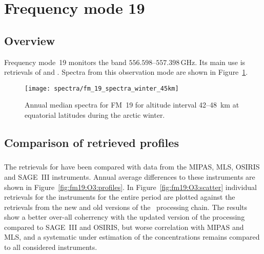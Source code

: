 \section{Frequency mode 19}
\label{sec:fm19}

\subsection{Overview}
\label{sec:fm19:overview}
Frequency mode~19 monitors the band $556.598$--$557.398\,\mathrm{GHz}$. Its
main use is retrievals of  and .
Spectra from this observation mode are shown in Figure~\ref{fig:spectra:19}.

\begin{figure}[ht]
    \texttt{[image: spectra/fm\_19\_spectra\_winter\_45km]}
    \caption{Annual median spectra for FM~19 for altitude interval 42--48~km at
        equatorial latitudes during the arctic winter.
    }\label{fig:spectra:19}
\end{figure}


\subsection{Comparison of retrieved profiles}
\label{sec:fm19:comparison}



\subsubsection{}
\label{sec:fm19:comparison:O3}
The retrievals for  have been compared with data from the MIPAS, MLS,
OSIRIS and SAGE~III instruments. Annual average differences to these
instruments are shown in Figure~\ref{fig:fm19:O3:profiles}. In
Figure~\ref{fig:fm19:O3:scatter} individual retrievals for the instruments for
the entire period are plotted against the retrievals from the new and old
versions of the \smr\ processing chain. The results show a better over-all
coherrency with the updated version of the processing compared to SAGE~III and
OSIRIS, but worse correlation with MIPAS and MLS, and a systematic under
estimation of the concentrations remains compared to all considered
instruments.

